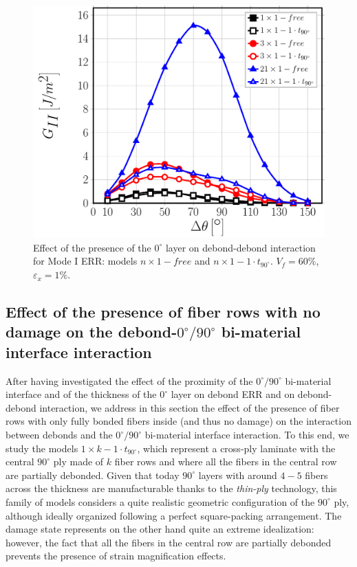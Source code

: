 \documentclass[review]{elsarticle}
\begin{document}
\begin{figure}[!h]
\centering
\includegraphics[width=\textwidth]{nx1-1-vf60-GII.pdf}
\caption{Effect of the presence of the $0^{\circ}$ layer on debond-debond interaction for Mode I ERR: models $n\times 1-free$ and $n\times 1-1\cdot t_{90^{\circ}}$. $V_{f}=60\%$, $\varepsilon_{x}=1\%$.}\label{fig:debonddebondGII}
\end{figure}

\subsection{Effect of the presence of fiber rows with no damage on the debond-$0^{\circ}/90^{\circ}$ bi-material interface interaction}

After having investigated the effect of the proximity of the $0^{\circ}/90^{\circ}$ bi-material interface and of the thickness of the $0^{\circ}$ layer on debond ERR and on debond-debond interaction, we address in this section the effect of the presence of fiber rows with only fully bonded fibers inside (and thus no damage) on the interaction between debonds and the $0^{\circ}/90^{\circ}$ bi-material interface interaction. To this end, we study the models $1\times k-1\cdot t_{90^{\circ}}$, which represent a cross-ply laminate with the central $90^{\circ}$ ply made of $k$ fiber rows and where all the fibers in the central row are partially debonded. Given that today $90^{\circ}$ layers with around $4-5$ fibers across the thickness are manufacturable thanks to the \emph{thin-ply} technology, this family of models considers a quite realistic geometric configuration of the $90^{\circ}$ ply, although ideally organized following a perfect square-packing arrangement. The damage state represents on the other hand quite an extreme idealization: however, the fact that all the fibers in the central row are partially debonded prevents the presence of strain magnification effects.
\end{document}

